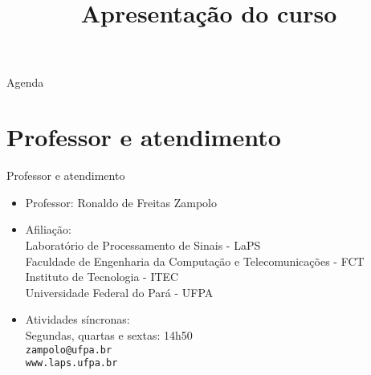 


\title{\cursogrande\\ \vspace{1cm}Apresentação do curso}


   \maketitle[randomdots={false}]
   \begin{slide}{Agenda}
      \tableofcontents[content=sections]
   \end{slide}

   \section[ slide = true]{Professor e atendimento}
      \begin{slide}[toc=]{Professor e atendimento}
         \begin{itemize}[type=1]
            \item Professor: Ronaldo de Freitas Zampolo 
            \item Afiliação:\\
                  Laboratório de Processamento de Sinais - LaPS\\
                  Faculdade de Engenharia da Computação e Telecomunicações - FCT\\
                  Instituto de Tecnologia - ITEC\\
                  Universidade Federal do Pará - UFPA
            \item Atividades síncronas:\\
                  Segundas, quartas e sextas: 14h50\\
                  \texttt{zampolo@ufpa.br}\\ 
                  \texttt{www.laps.ufpa.br}
         \end{itemize}
      \end{slide}

